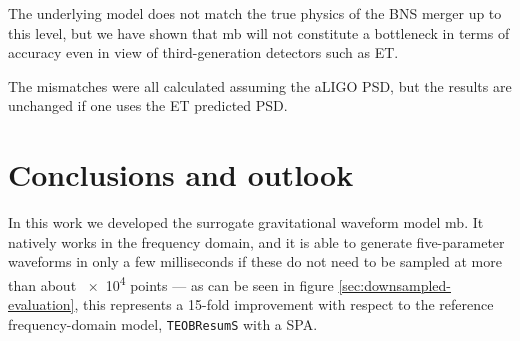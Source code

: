 \documentclass[main.tex]{subfiles}
\begin{document}
The underlying model does not match the true physics of the \ac{BNS} merger up to this level, but we have shown that \ac{mb} will not constitute a bottleneck in terms of accuracy even in view of third-generation detectors such as \ac{ET}.



The mismatches were all calculated assuming the \ac{aLIGO} \ac{PSD}, but the results are unchanged if one uses the \ac{ET} predicted \ac{PSD}. 


\chapter{Conclusions and outlook}


In this work we developed the surrogate gravitational waveform model \ac{mb}.
It natively works in the frequency domain, and it is able to generate five-parameter waveforms in only a few milliseconds if these do not need to be sampled at more than about \num{e4} points --- as can be seen in figure \ref{sec:downsampled-evaluation}, this represents a 15-fold improvement with respect to the reference frequency-domain model, \texttt{TEOBResumS} with a \ac{SPA}.
\end{document}
